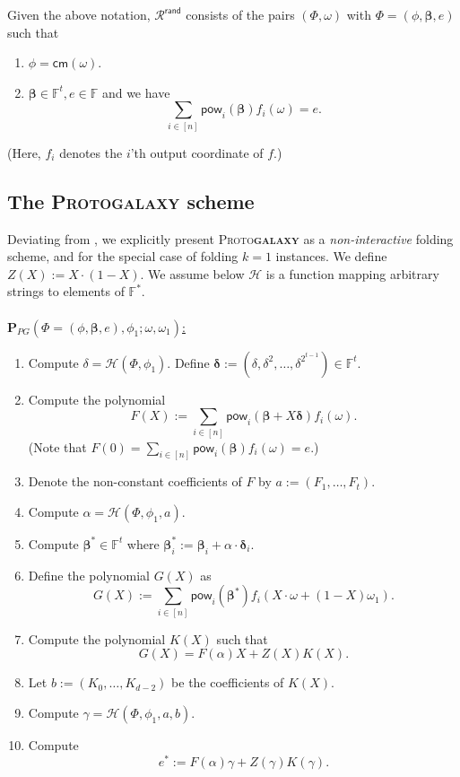 \documentclass[11pt]{article} %
\newcommand{\protogal}{{\scshape Proto\bfseries{galaxy}}\xspace}
\newcommand{\F}{\ensuremath{\mathbb F}\xspace}
\newcommand{\Fstar}{\ensuremath{\mathbb F^*}\xspace}
\newcommand{\cm}{\ensuremath{\mathsf{cm}}\xspace}
\newcommand{\rej}{\ensuremath{\mathsf{reject}}\xspace}
\newcommand{\defeq}{:=}
\newcommand{\hash}{\ensuremath{\mathcal{H}}\xspace}
\newcommand{\prv}{\ensuremath{\mathsf{\mathbf{P}}}\xspace}
\newcommand{\inst}{\ensuremath{\phi}\xspace}
\newcommand{\wit}{\ensuremath{\mathsf{\omega}}\xspace}
\newcommand{\ver}{\ensuremath{\mathsf{\mathbf{V}}}\xspace}
\newcommand{\relrand}{\ensuremath{\mathcal{R^{\mathsf{rand}}}}\xspace}
\newcommand{\sumi}[1]{\sum_{i\in[#1]}}
\newcommand{\betaa}{\ensuremath{\mathbf{\boldsymbol{\beta}}}\xspace}
\newcommand{\deltaa}{\ensuremath{\mathbf{\boldsymbol{\delta}}}\xspace}
\newcommand{\insttbase}{\ensuremath{\Phi}\xspace}
\newcommand{\pow}{\ensuremath{\mathsf{pow}}\xspace}
\begin{document}
  Given the above notation, $\relrand$ consists of the pairs $( \insttbase,\wit)$ with $\insttbase=(\inst,\betaa,e)$ such that
 \begin{enumerate}
  \item $\inst=\cm(\wit)$.
  \item $\betaa\in \F^t, e\in \F$ and we have 
  \[\sumi{n}\pow_i(\betaa) f_i(\wit) = e.\]
 \end{enumerate}
(Here, $f_i$ denotes the $i$'th output coordinate of $f$.) 
\subsection{The \protogal scheme}
Deviating from \cite{protogal}, we explicitly present \protogal as a \emph{non-interactive} folding scheme, and for the special case of folding $k=1$ instances.
We define $Z(X)\defeq X\cdot(1-X)$. We assume below \hash is a function mapping arbitrary strings to elements of \Fstar. \\ \\ \noindent
\underline{$\prv_{PG}(\insttbase=(\inst,\betaa,e),\inst_1;\wit,\wit_1)$:}
\begin{enumerate}
 \item Compute $\delta=\hash(\insttbase,\inst_1)$. Define $\deltaa\defeq (\delta,\delta^2,\ldots,\delta^{2^{t-1}})\in \F^t$.
 \item\label{step:computeF} Compute the polynomial 
 \[F(X)\defeq \sumi{n}\pow_i(\betaa+X\deltaa) f_i(\wit).\]
 (Note that $F(0)=\sumi{n} \pow_i(\betaa) f_i(\wit) = e$.)
\item\label{step:sendFcoeffs} Denote the non-constant coefficients of $F$ by $a\defeq (F_1,\ldots,F_t)$.
\item Compute $\alpha = \hash(\insttbase,\inst_1,a)$.
\item\label{step:computeBetastar} Compute $\betaa^*\in \F^t$ where $\betaa^*_i\defeq \betaa_i+\alpha\cdot \deltaa_i$.
\item\label{step:computeG} Define the polynomial $G(X)$ as 
\[G(X)\defeq \sumi{n}\pow_i(\betaa^*) f_i(X\cdot \wit + (1-X)\wit_1).\]
\item Compute the polynomial $K(X)$ such that 
\[G(X)= F(\alpha) X + Z(X) K(X).\]
\item\label{step:sendK} Let $b\defeq (K_0,\ldots,K_{d-2})$ be the coefficients of $K(X)$.
\item Compute $\gamma=\hash(\insttbase,\inst_1,a,b)$.
\item\label{step:compute-estar} Compute 
\[e^* \defeq F(\alpha)\gamma + Z(\gamma)K(\gamma).\]
\end{enumerate}
\end{document}
